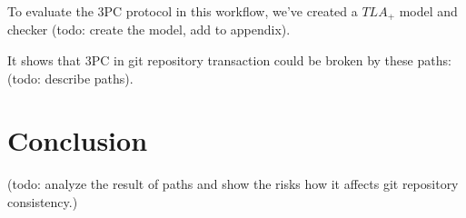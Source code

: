 \documentclass[acmlarge, screen, nonacm]{acmart}
\begin{document}
To evaluate the 3PC protocol in this workflow, we've created a $TLA_{+}$ model and checker
(todo: create the model, add to appendix).

It shows that 3PC in git repository transaction could be broken by these paths: (todo: describe paths).

\section{Conclusion}

(todo: analyze the result of paths and show the risks how it affects git repository consistency.)
\end{document}
